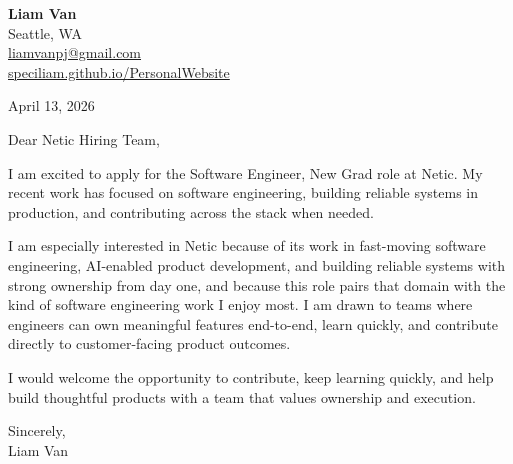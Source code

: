 \documentclass[letterpaper,11pt]{article}
\begin{document}
\begin{flushleft}
\textbf{\Large Liam Van} \\
Seattle, WA \\
\href{mailto:liamvanpj@gmail.com}{liamvanpj@gmail.com} \\
\href{https://speciliam.github.io/PersonalWebsite}{speciliam.github.io/PersonalWebsite}
\end{flushleft}

April 13, 2026

\noindent Dear Netic Hiring Team,

\noindent I am excited to apply for the Software Engineer, New Grad role at Netic. My recent work has focused on software engineering, building reliable systems in production, and contributing across the stack when needed.

\noindent I am especially interested in Netic because of its work in fast-moving software engineering, AI-enabled product development, and building reliable systems with strong ownership from day one, and because this role pairs that domain with the kind of software engineering work I enjoy most. I am drawn to teams where engineers can own meaningful features end-to-end, learn quickly, and contribute directly to customer-facing product outcomes.

\noindent I would welcome the opportunity to contribute, keep learning quickly, and help build thoughtful products with a team that values ownership and execution.

\noindent Sincerely, \\
Liam Van
\end{document}
